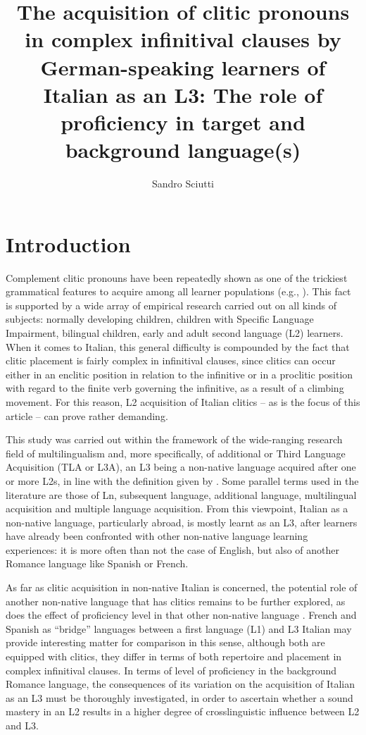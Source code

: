 \documentclass[output=paper,modfonts,nonflat,newtxmath]{langsci/langscibook}
\author{Sandro Sciutti\affiliation{University of Genoa}}
\title{The acquisition of clitic pronouns in complex infinitival clauses by German-speaking learners of Italian as an L3: The role of proficiency in target and background language(s)}
\begin{document}
\maketitle
\newpage
\section{Introduction}%
\label{sec:sciutti:1}

Complement clitic pronouns have been repeatedly shown as one of the trickiest grammatical features to acquire among all learner populations (e.g., \citealt{BellettiGuasti2015}). This fact is supported by a wide array of empirical research carried out on all kinds of subjects: normally developing children, children with Specific Language Impairment, bilingual children, early and adult second language (L2) learners. When it comes to Italian, this general difficulty is compounded by the fact that clitic placement is fairly complex in infinitival clauses, since clitics can occur either in an enclitic position in relation to the infinitive or in a proclitic position with regard to the finite verb governing the infinitive, as a result of a climbing movement. For this reason, L2 acquisition of Italian clitics – as is the focus of this article – can prove rather demanding.

This study was carried out within the framework of the wide-ranging research field of multilingualism and, more specifically, of additional or Third Language Acquisition (TLA or L3A), an L3 being a non-native language acquired after one or more L2s, in line with the definition given by \citet[97]{Hammarberg2010}. Some parallel terms used in the literature are those of Ln, subsequent language, additional language, multilingual acquisition and multiple language acquisition. From this viewpoint, Italian as a non-native language, particularly abroad, is mostly learnt as an L3, after learners have already been confronted with other non-native language learning experiences: it is more often than not the case of English, but also of another Romance language like Spanish or French.

As far as clitic acquisition in non-native Italian is concerned, the potential role of another non-native language that has clitics remains to be further explored, as does the effect of proficiency level in that other non-native language \citep[238--239]{Giannini2008}. French and Spanish as “bridge” languages between a first language (L1) and L3 Italian may provide interesting matter for comparison in this sense, although both are equipped with clitics, they differ in terms of both repertoire and placement in complex infinitival clauses. In terms of level of proficiency in the background Romance language, the consequences of its variation on the acquisition of Italian as an L3 must be thoroughly investigated, in order to ascertain whether a sound mastery in an L2 results in a higher degree of crosslinguistic influence between L2 and L3.
\end{document}
